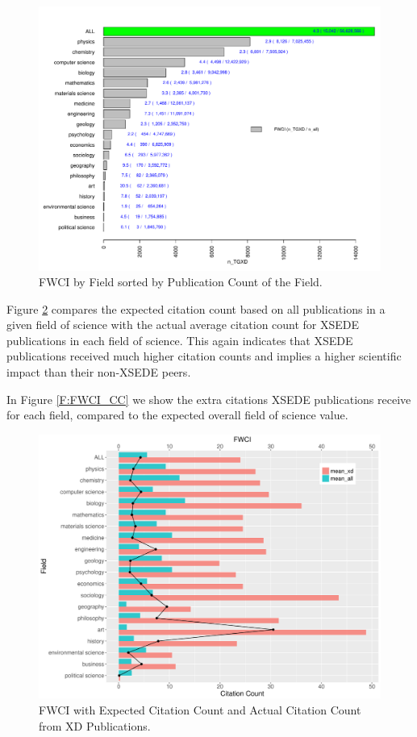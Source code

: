 \documentclass{sig-alternate}
\begin{document}
\begin{figure}[htb!]
    \includegraphics[width=0.95\columnwidth]{images/fwci_nxd.pdf}
    \caption{FWCI by Field sorted by Publication Count of the Field.}
    \label{F:fwci_nxd}
\end{figure}

Figure \ref{F:FWCIwCC} compares the expected citation count based on
all publications in a given field of science with the actual average
citation count for XSEDE publications in each field of science. This
again indicates that XSEDE publications received much higher citation
counts and implies a higher scientific impact than their non-XSEDE
peers.

In Figure \ref{F:FWCI_CC} we show the extra citations XSEDE
publications receive for each field, compared to the expected overall
field of science value.

\begin{figure}[htb!]
    \includegraphics[width=0.95\columnwidth]{images/FWCIwCC.pdf}
    \caption{FWCI with Expected Citation Count and Actual Citation Count from XD Publications.}
    \label{F:FWCIwCC}
\end{figure}
\end{document}
